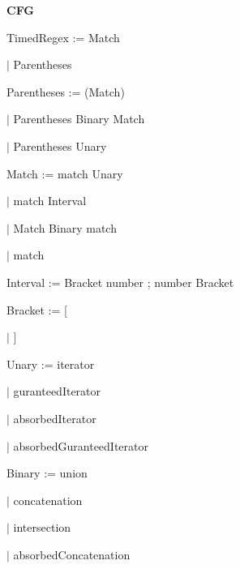 
\textbf{CFG}

TimedRegex := Match

\qquad	$\mid$ Parentheses

Parentheses := (Match)

\qquad	$\mid$ Parentheses Binary Match

\qquad	$\mid$ Parentheses Unary

Match := match Unary

\qquad	$\mid$ match Interval

\qquad    $\mid$ Match Binary match

\qquad	$\mid$ match

Interval := Bracket number ; number Bracket

Bracket := [

\qquad	$\mid$ ]

Unary := iterator

\qquad	$\mid$ guranteedIterator

\qquad	$\mid$ absorbedIterator

\qquad	$\mid$ absorbedGuranteedIterator

Binary := union

\qquad	$\mid$ concatenation

\qquad	$\mid$ intersection

\qquad	$\mid$ absorbedConcatenation

